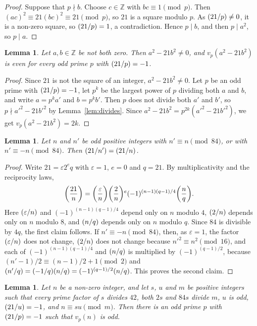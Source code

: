 \documentclass[11pt]{article}
\newtheorem{lemma}[theorem]{Lemma}
\newcommand{\Z}{\mathbb{Z}}
\newcommand{\leg}[2]{\mathchoice{\biggl(\dfrac{#1}{#2}\biggr)}{(#1/#2)}{(#1/#2)}{(#1/#2)}}
\begin{document}
\begin{proof}
Suppose that $p\nmid b$. Choose $c\in\Z$ with $bc\equiv1\pmod p$. Then $(ac)^2\equiv21(bc)^2\equiv21\pmod p$, so $21$ is a square modulo $p$. As $\leg{21}{p}\neq0$, it is a non-zero square, so $\leg{21}{p}=1$, a contradiction. Hence $p\mid b$, and then $p\mid a^2$, so $p\mid a$.
\end{proof}

\begin{lemma}\label{lem:even}
Let $a,b\in\Z$ be not both zero. Then $a^2-21b^2\neq0$, and $v_p(a^2-21b^2)$ is even for every odd prime $p$ with $\leg{21}{p}=-1$.
\end{lemma}

\begin{proof}
Since $21$ is not the square of an integer, $a^2-21b^2\neq0$. Let $p$ be an odd prime with $\leg{21}{p}=-1$, let $p^k$ be the largest power of $p$ dividing both $a$ and $b$, and write $a=p^ka'$ and $b=p^kb'$. Then $p$ does not divide both $a'$ and $b'$, so $p\nmid a'^2-21b'^2$ by Lemma~\ref{lem:divides}. Since $a^2-21b^2=p^{2k}(a'^2-21b'^2)$, we get $v_p(a^2-21b^2)=2k$.
\end{proof}

\begin{lemma}\label{lem:period}
Let $n$ and $n'$ be odd positive integers with $n'\equiv n\pmod{84}$, or with $n'\equiv-n\pmod{84}$. Then $\leg{21}{n'}=\leg{21}{n}$.
\end{lemma}

\begin{proof}
Write $21=\varepsilon2^eq$ with $\varepsilon=1$, $e=0$ and $q=21$. By multiplicativity and the reciprocity laws,
\[
\leg{21}{n}=\leg{\varepsilon}{n}\leg{2}{n}^e(-1)^{(n-1)(q-1)/4}\leg{n}{q}.
\]
Here $\leg{\varepsilon}{n}$ and $(-1)^{(n-1)(q-1)/4}$ depend only on $n$ modulo $4$, $\leg{2}{n}$ depends only on $n$ modulo $8$, and $\leg{n}{q}$ depends only on $n$ modulo $q$. Since $84$ is divisible by $4q$, the first claim follows. If $n'\equiv-n\pmod{84}$, then, as $\varepsilon=1$, the factor $\leg{\varepsilon}{n}$ does not change, $\leg{2}{n}$ does not change because $n'^2\equiv n^2\pmod{16}$, and each of $(-1)^{(n-1)(q-1)/4}$ and $\leg{n}{q}$ is multiplied by $(-1)^{(q-1)/2}$, because $(n'-1)/2\equiv(n-1)/2+1\pmod 2$ and $\leg{n'}{q}=\leg{-1}{q}\leg{n}{q}=(-1)^{(q-1)/2}\leg{n}{q}$. This proves the second claim.
\end{proof}

\begin{lemma}\label{lem:odd}
Let $n$ be a non-zero integer, and let $s$, $u$ and $m$ be positive integers such that every prime factor of $s$ divides $42$, both $2s$ and $84s$ divide $m$, $u$ is odd, $\leg{21}{u}=-1$, and $n\equiv su\pmod m$. Then there is an odd prime $p$ with $\leg{21}{p}=-1$ such that $v_p(n)$ is odd.
\end{lemma}
\end{document}
